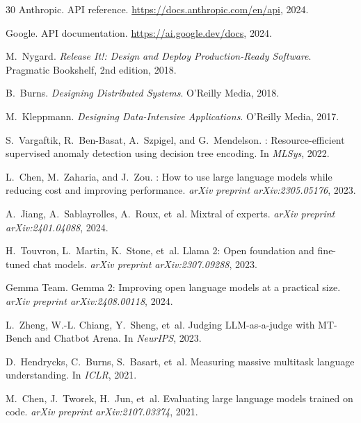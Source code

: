 \documentclass[11pt,twocolumn]{article}
\begin{document}
\begin{thebibliography}{30}
Anthropic.
 {API} reference.
\newblock \url{https://docs.anthropic.com/en/api}, 2024.

Google.
 {API} documentation.
\newblock \url{https://ai.google.dev/docs}, 2024.

M.~Nygard.
\newblock \emph{Release It!: Design and Deploy Production-Ready Software}.
\newblock Pragmatic Bookshelf, 2nd edition, 2018.

B.~Burns.
\newblock \emph{Designing Distributed Systems}.
\newblock O'Reilly Media, 2018.

M.~Kleppmann.
\newblock \emph{Designing Data-Intensive Applications}.
\newblock O'Reilly Media, 2017.

S.~Vargaftik, R.~Ben-Basat, A.~Szpigel, and G.~Mendelson.
: Resource-efficient supervised anomaly detection using decision tree encoding.
\newblock In \emph{MLSys}, 2022.

L.~Chen, M.~Zaharia, and J.~Zou.
: How to use large language models while reducing cost and improving performance.
\newblock \emph{arXiv preprint arXiv:2305.05176}, 2023.

A.~Jiang, A.~Sablayrolles, A.~Roux, et~al.
\newblock Mixtral of experts.
\newblock \emph{arXiv preprint arXiv:2401.04088}, 2024.

H.~Touvron, L.~Martin, K.~Stone, et~al.
\newblock Llama 2: Open foundation and fine-tuned chat models.
\newblock \emph{arXiv preprint arXiv:2307.09288}, 2023.

Gemma Team.
\newblock Gemma 2: Improving open language models at a practical size.
\newblock \emph{arXiv preprint arXiv:2408.00118}, 2024.

L.~Zheng, W.-L. Chiang, Y.~Sheng, et~al.
\newblock Judging {LLM}-as-a-judge with {MT-Bench} and {Chatbot Arena}.
\newblock In \emph{NeurIPS}, 2023.

D.~Hendrycks, C.~Burns, S.~Basart, et~al.
\newblock Measuring massive multitask language understanding.
\newblock In \emph{ICLR}, 2021.

M.~Chen, J.~Tworek, H.~Jun, et~al.
\newblock Evaluating large language models trained on code.
\newblock \emph{arXiv preprint arXiv:2107.03374}, 2021.

\end{thebibliography}
\end{document}
